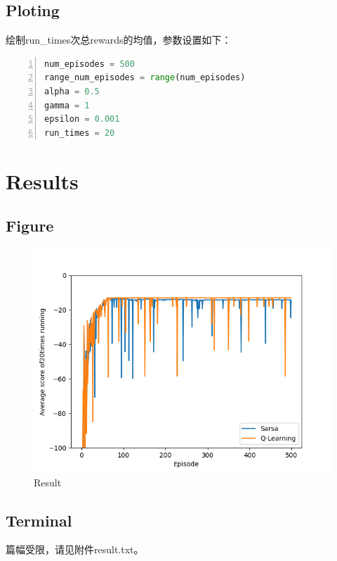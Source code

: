 \documentclass[a4paper, 11pt]{article}
\begin{document}
\subsection{Ploting}

绘制run\_times次总rewards的均值，参数设置如下：

\begin{lstlisting}[frame=single,language=python,numbers=left]
num_episodes = 500
range_num_episodes = range(num_episodes)
alpha = 0.5
gamma = 1
epsilon = 0.001
run_times = 20
\end{lstlisting}

\section{Results}

\subsection{Figure}

\begin{figure}[H]
  \centering
  \includegraphics[width=18cm]{result.png}
  \caption{Result}
\end{figure}

\subsection{Terminal}

篇幅受限，请见附件result.txt。

%
%
\end{document}
